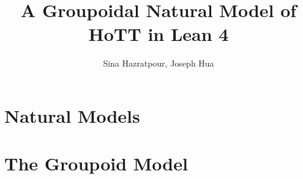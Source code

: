 \documentclass[a4paper]{report}
\title{A Groupoidal Natural Model of HoTT in Lean 4}
\author{Sina Hazratpour, Joseph Hua}
\numberwithin{equation}{section}
\begin{document}
\maketitle


\section{Natural Models}


\section{The Groupoid Model}



{}

\end{document}
